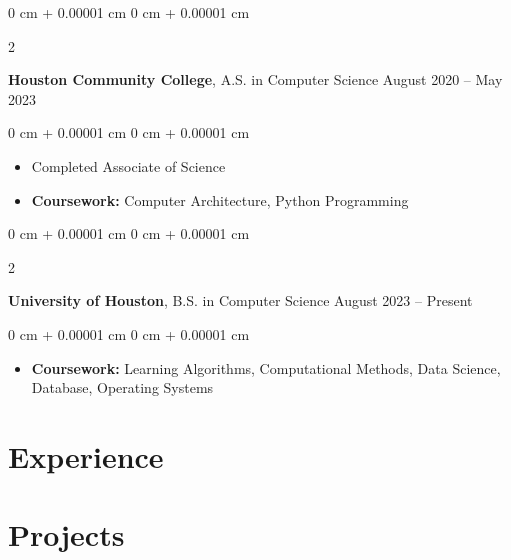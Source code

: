 \documentclass[10pt, letterpaper]{article}
\newenvironment{highlights}{
    \begin{itemize}[
        topsep=0.10 cm,
        parsep=0.10 cm,
        partopsep=0pt,
        itemsep=0pt,
        leftmargin=0 cm + 10pt
    ]
}{
    \end{itemize}
} %
\newenvironment{onecolentry}{
    \begin{adjustwidth}{
        0 cm + 0.00001 cm
    }{
        0 cm + 0.00001 cm
    }
}{
    \end{adjustwidth}
} %
\newenvironment{twocolentry}[2][]{
    \onecolentry
    \def\secondColumn{#2}
    \setcolumnwidth{\fill, 4.5 cm}
    \begin{paracol}{2}
}{
    \switchcolumn \raggedleft \secondColumn
    \end{paracol}
    \endonecolentry
} %
\begin{document}
        
        \begin{twocolentry}{
            August 2020 – May 2023
        }
            \textbf{Houston Community College}, A.S. in Computer Science\end{twocolentry}

        \vspace{0.10 cm}
        \begin{onecolentry}
            \begin{highlights}
                \item  Completed Associate of Science
                \item \textbf{Coursework:} Computer Architecture, Python Programming
            \end{highlights}
        \end{onecolentry}

        \vspace{0.30 cm}

        \begin{twocolentry}{
            August 2023 – Present
        }
            \textbf{University of Houston}, B.S. in Computer Science\end{twocolentry}

        \vspace{0.10 cm}
        \begin{onecolentry}
            \begin{highlights}
                \item \textbf{Coursework:} Learning Algorithms, Computational Methods, Data Science, Database, Operating Systems
            \end{highlights}
        \end{onecolentry}
    
    
    \vspace{0.30 cm}

    
    \section{Experience}

    \vspace{0.30 cm}


        



    
    \section{Projects}
\end{document}
